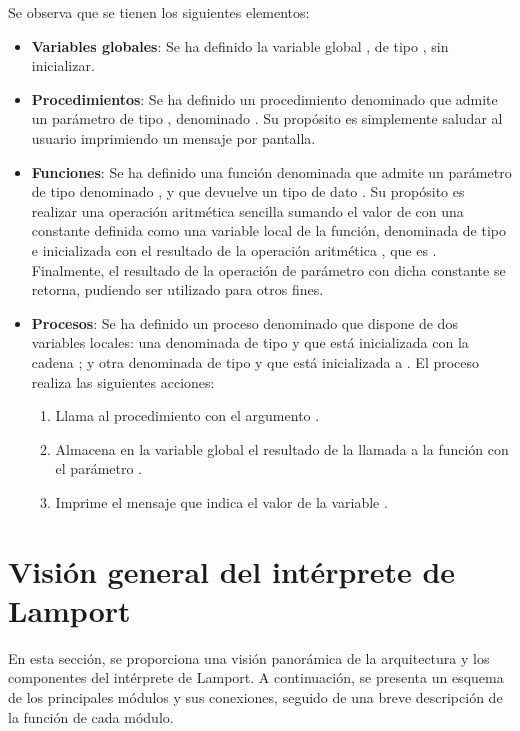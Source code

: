 \noindent
Se observa que se tienen los siguientes elementos:
\begin{itemize}
    \item \textbf{Variables globales}: Se ha definido la variable global , de tipo , sin inicializar.
    \item \textbf{Procedimientos}: Se ha definido un procedimiento denominado  que admite un parámetro de tipo , denominado . Su propósito es simplemente saludar al usuario imprimiendo un mensaje por pantalla.
    \item \textbf{Funciones}: Se ha definido una función denominada  que admite un parámetro de tipo  denominado , y que devuelve un tipo de dato . Su propósito es realizar una operación aritmética sencilla sumando el valor de  con una constante definida como una variable local de la función, denominada  de tipo  e inicializada con el resultado de la operación aritmética , que es . Finalmente, el resultado de la operación de parámetro con dicha constante se retorna, pudiendo ser utilizado para otros fines.
    \item \textbf{Procesos}: Se ha definido un proceso denominado  que dispone de dos variables locales: una denominada  de tipo  y que está inicializada con la cadena ; y otra denominada  de tipo  y que está inicializada a . El proceso realiza las siguientes acciones:
    \begin{enumerate}
        \item Llama al procedimiento  con el argumento .
        \item Almacena en la variable global  el resultado de la llamada a la función  con el parámetro .
        \item Imprime el mensaje que indica el valor de la variable .
    \end{enumerate}
\end{itemize}

\section{Visión general del intérprete de Lamport}
En esta sección, se proporciona una visión panorámica de la arquitectura y los componentes del intérprete de Lamport. A continuación, se presenta un esquema de los principales módulos y sus conexiones, seguido de una breve descripción de la función de cada módulo.

